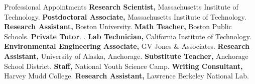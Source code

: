 \begin{rubric}{Professional Appointments}
%
	\textbf{Research Scientist,} Massachusetts Institute of Technology.
%
\entry*[2016 -- 2021]%
	\textbf{Postdoctoral Associate,} Massachusetts Institute of Technology.
%
\entry*[2011 -- 2015]%
	\textbf{Research Assistant,} Boston University.
%
\entry*[2010 -- 2011]%
	\textbf{Math Teacher,} Boston Public Schools.
%
\entry*[2004 -- 2010]%
	\textbf{Private Tutor}. .
%
\entry*[2007 -- 2008]%
	\textbf{Lab Technician,} California Institute of Technology.
%
\entry*[2005 -- 2006]%
	\textbf{Environmental Engineering Associate,} GV Jones \& Associates.
%
\entry*[2004 -- 2005]%
	\textbf{Research Assistant,} University of Alaska, Anchorage.
%
\entry*[2003 -- 2005]%
	\textbf{Substitute Teacher,} Anchorage School District.
%
\entry*[2004]%
	\textbf{Staff,} National Youth Science Camp.
%
\entry*[2001 -- 2003]%
	\textbf{Writing Consultant,} Harvey Mudd College.
%
\entry*[2002]%
	\textbf{Research Assistant,}  Lawrence Berkeley National Lab.
%
\end{rubric}

